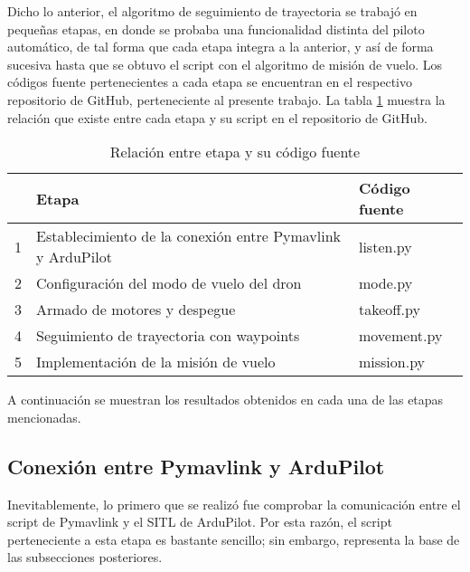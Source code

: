 Dicho lo anterior, el algoritmo de seguimiento de trayectoria se trabajó en pequeñas etapas, en donde se probaba una funcionalidad distinta del piloto automático, de tal forma que cada etapa integra a la anterior, y así de forma sucesiva hasta que se obtuvo el script con el algoritmo de misión de vuelo. Los códigos fuente pertenecientes a cada etapa se encuentran en el respectivo repositorio de GitHub, perteneciente al presente trabajo. La tabla \ref{tab:pymavlink} muestra la relación que existe entre cada etapa y su script en el repositorio de GitHub.

\begin{table}
    \centering
    \begin{tabular}{||l|l|l||}
        \hline
          & Etapa & Código fuente\\
        \hline
        1 & Establecimiento de la conexión entre Pymavlink y ArduPilot & listen.py\\
        2 & Configuración del modo de vuelo del dron & mode.py\\
        3 & Armado de motores y despegue & takeoff.py\\
        4 & Seguimiento de trayectoria con waypoints & movement.py\\
        5 & Implementación de la misión de vuelo & mission.py\\
        \hline
    \end{tabular}
    \caption{Relación entre etapa y su código fuente}
    \label{tab:pymavlink}
\end{table}

A continuación se muestran los resultados obtenidos en cada una de las etapas mencionadas. 

\subsection{Conexión entre Pymavlink y ArduPilot}

Inevitablemente, lo primero que se realizó fue comprobar la comunicación entre el script de Pymavlink y el SITL de ArduPilot. Por esta razón, el script perteneciente a esta etapa es bastante sencillo; sin embargo, representa la base de las subsecciones posteriores.

